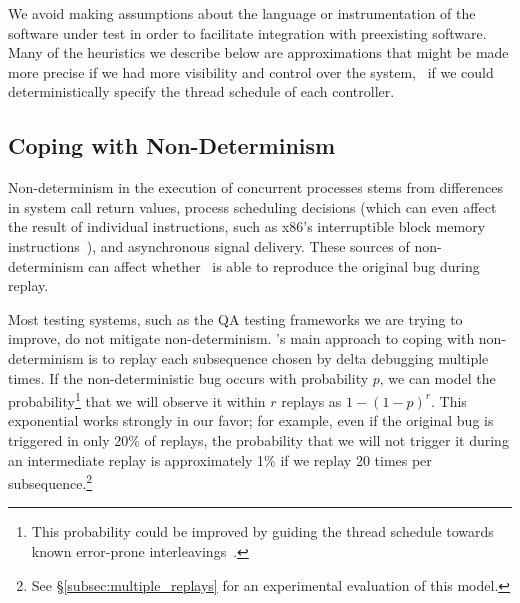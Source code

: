 We avoid making assumptions about the language or instrumentation of the
software under test in order to facilitate integration with preexisting software. Many of the heuristics we describe below are
approximations that might be made more precise if we had more visibility and
control over the system, \eg~if we could deterministically specify the thread schedule of each
controller.


\subsection{Coping with Non-Determinism}
\label{subsec:coping}

Non-determinism in the execution of concurrent processes stems from
differences in system call return values, process scheduling decisions (which can
even affect the result of individual instructions, such as x86's
interruptible block memory instructions~\cite{Dunlap:2002:REI:844128.844148}),
and asynchronous signal
delivery. These sources of non-determinism can affect whether \projectname~is
able to reproduce the original bug during replay.

Most testing systems, such as the QA testing frameworks we are
trying to improve, do not mitigate non-determinism.
\projectname's main approach to coping with non-determinism
is to replay each subsequence chosen
by delta debugging multiple times. If the non-deterministic bug occurs with
probability $p$, we can model the probability\footnote{This probability could be improved by guiding the thread schedule
towards known error-prone interleavings~\cite{park2009ctrigger,park2009pres}.}
that we will observe it within $r$ replays as $1-(1-p)^{r}$. This exponential
works strongly in our favor; for example, even if the original bug is
triggered in only 20\% of replays, the probability that we will not trigger
it during an intermediate replay is approximately
1\% if we replay 20 times per subsequence.\footnote{See
\S\ref{subsec:multiple_replays} for an experimental evaluation of this model.}

